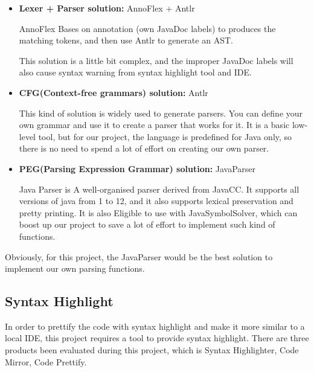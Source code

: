 \documentclass[runningheads]{llncs}
\begin{document}
\begin{itemize}
	\item \textbf{Lexer + Parser solution:} AnnoFlex\cite{AnnoFlex} + Antlr\cite{Antlr}

	AnnoFlex Bases on annotation (own JavaDoc labels) to produces the matching tokens, and then use Antlr to generate an AST.

	This solution is a little bit complex, and the improper JavaDoc labels will also cause syntax warning from syntax highlight tool and IDE.

	\item \textbf{CFG(Context-free grammars) solution:} Antlr\cite{Antlr}

	This kind of solution is widely used to generate parsers. You can define your own grammar and use it to create a parser that works for it. It is a basic low-level tool, but for our project, the language is predefined for Java only, so there is no need to spend a lot of effort on creating our own parser.

	\item \textbf{PEG(Parsing Expression Grammar) solution:} JavaParser\cite{JavaParser}

	Java Parser is A well-organised parser derived from JavaCC. It supports all versions of java from 1 to 12, and it also supports lexical preservation and pretty printing. It is also Eligible to use with JavaSymbolSolver, which can boost up our project to save a lot of effort to implement such kind of functions.
\end{itemize}
Obviously, for this project, the JavaParser would be the best solution to implement our own parsing functions.

\subsection{Syntax Highlight}
In order to prettify the code with syntax highlight and make it more similar to a local IDE, this project requires a tool to provide syntax highlight. There are three products been evaluated during this project, which is Syntax Highlighter\cite{syntaxhighlighter}, Code Mirror\cite{codemirror}, Code Prettify\cite{code-prettify}.
\end{document}
